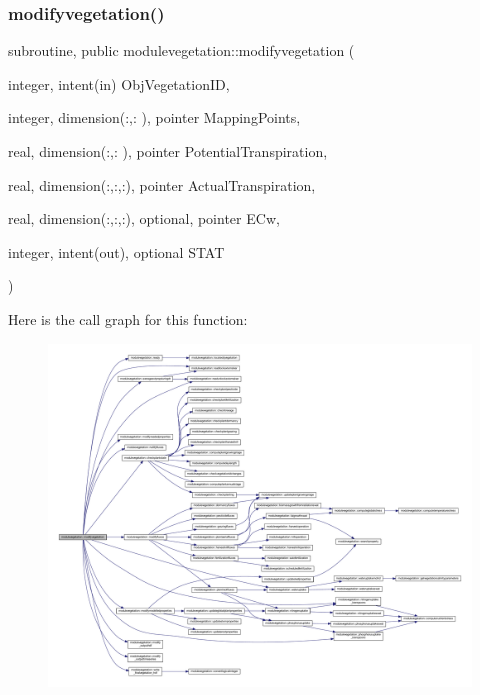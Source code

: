 \subsubsection{\texorpdfstring{modifyvegetation()}{modifyvegetation()}}
{\footnotesize\ttfamily subroutine, public modulevegetation\+::modifyvegetation (\begin{DoxyParamCaption}\item[{integer, intent(in)}]{Obj\+Vegetation\+ID,  }\item[{integer, dimension(\+:,\+:  ), pointer}]{Mapping\+Points,  }\item[{real, dimension(\+:,\+:  ), pointer}]{Potential\+Transpiration,  }\item[{real, dimension(\+:,\+:,\+:), pointer}]{Actual\+Transpiration,  }\item[{real, dimension(\+:,\+:,\+:), optional, pointer}]{E\+Cw,  }\item[{integer, intent(out), optional}]{S\+T\+AT }\end{DoxyParamCaption})}

Here is the call graph for this function\+:\nopagebreak
\begin{figure}[H]
\begin{center}
\leavevmode
\includegraphics[width=350pt]{namespacemodulevegetation_ada29538c07fc35e07aff7961509fee8d_cgraph}
\end{center}
\end{figure}
\mbox{\label{namespacemodulevegetation_ac64ef166fcd5b553f404eca77d3f8ad4}} 
